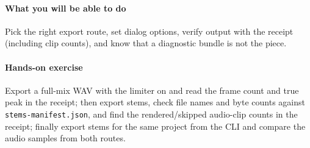 \paragraph{What you will be able to do} Pick the right export route, set dialog options, verify output with the receipt (including clip counts), and know that a diagnostic bundle is not the piece.

\paragraph{Hands-on exercise} Export a full-mix WAV with the limiter on and read the frame count and true peak in the receipt; then export stems, check file names and byte counts against \texttt{stems-manifest.json}, and find the rendered/skipped audio-clip counts in the receipt; finally export stems for the same project from the CLI and compare the audio samples from both routes.
